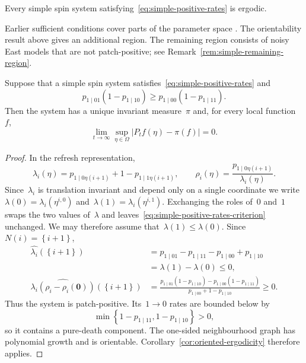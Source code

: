 \documentclass[EJP,preprint,NODS,nobera]{ejpecp}
\newcommand{\bb}[1]{\left(#1\right)}
\newcommand{\cb}[1]{\left\{#1\right\}}
\newcommand{\abs}[1]{\left|#1\right|}
\newcommand{\mb}[1]{\mathbf{#1}}
\begin{document}
\begin{conjecture}
\label{conj:simple-positive-rates}
Every simple spin system satisfying~\eqref{eq:simple-positive-rates} is ergodic.
\end{conjecture}

Earlier sufficient conditions cover parts of the parameter space
\cite{GluchowskiMenz2025,GluchowskiMenz2026}. The orientability result above
gives an additional region. The remaining region consists of noisy East
models that are not patch-positive; see
Remark~\ref{rem:simple-remaining-region}.

\begin{corollary}
\label{cor:simple-positive-rates}
Suppose that a simple spin system satisfies~\eqref{eq:simple-positive-rates}
and
\begin{equation}
\label{eq:simple-positive-rates-criterion}
p_{1\mid01}(1-p_{1\mid10})
\geq
p_{1\mid00}(1-p_{1\mid11}).
\end{equation}
Then the system has a unique invariant measure~$\pi$ and, for every local
function~$f$,
\begin{equation*}
\lim_{t\to\infty}
\sup_{\eta\in\Omega}
\abs{P_tf(\eta)-\pi(f)}
=
0.
\end{equation*}
\end{corollary}

\begin{proof}
In the refresh representation,
\begin{equation*}
\lambda_i(\eta)
=
p_{1\mid0\eta(i+1)}+1-p_{1\mid1\eta(i+1)},
\qquad
\rho_i(\eta)
=
\frac{p_{1\mid0\eta(i+1)}}{\lambda_i(\eta)}.
\end{equation*}
Since~$\lambda_i$ is translation invariant and depend only on a single coordinate we write~$\lambda(0)=\lambda_i(\eta^{i,0})$ and~$\lambda(1)=\lambda_i(\eta^{i,1})$.  Exchanging the roles of~$0$ and~$1$ swaps the two values of~$\lambda$ and
leaves~\eqref{eq:simple-positive-rates-criterion} unchanged. We may therefore
assume that~$\lambda(1)\leq\lambda(0)$. Since
$N(i)=\cb{i+1}$,
\begin{align*}
\widehat{\lambda_i}\bb{\cb{i+1}}
&=
p_{1\mid01}-p_{1\mid11}-p_{1\mid00}+p_{1\mid10}\\
&= \lambda(1)-\lambda(0)
\leq0,\\
\widehat{\lambda_i\bb{\rho_i-\rho_i(\mb0)}}\bb{\cb{i+1}}
&=
\frac{
p_{1\mid01}(1-p_{1\mid10})
-
p_{1\mid00}(1-p_{1\mid11})
}{
p_{1\mid00}+1-p_{1\mid10}
}
\geq0.
\end{align*}
Thus the system is patch-positive. Its~$1\to0$ rates are bounded below by
\begin{equation*}
\min\cb{1-p_{1\mid11},1-p_{1\mid10}}>0,
\end{equation*}
so it contains a pure-death component. The one-sided neighbourhood graph has
polynomial growth and is orientable. Corollary~\ref{cor:oriented-ergodicity}
therefore applies.
\end{proof}
\end{document}
